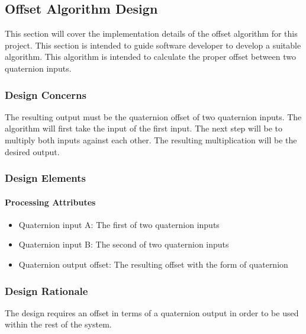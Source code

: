	\subsection{Offset Algorithm Design}
	This section will cover the implementation details of the offset algorithm for this project. This section is intended to guide software developer to develop a suitable algorithm. This algorithm is intended to calculate the proper offset between two quaternion inputs.\\

		\subsubsection{Design Concerns}
		The resulting output must be the quaternion offset of two quaternion inputs. The algorithm will first take the input of the first input. The next step will be to multiply both inputs against each other. The resulting multiplication will be the desired output.\\

		\subsubsection{Design Elements}
			\paragraph{Processing Attributes}
					\begin{itemize}
						\item Quaternion input A: The first of two quaternion inputs
						\item Quaternion input B: The second of two quaternion inputs
						\item Quaternion output offset: The resulting offset with the form of quaternion\\
					\end{itemize}

		\subsubsection{Design Rationale}
		The design requires an offset in terms of a quaternion output in order to be used within the rest of the system. 

